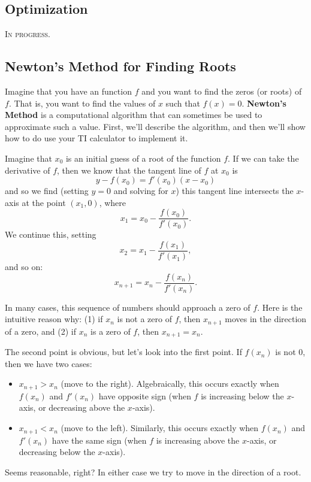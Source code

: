 \documentclass{article}
\newcommand{\mar}[1]{\marginpar{\begin{tcolorbox}[colback=white, arc=0in, left=1mm, right=1mm, leftrule=.3em, bottomrule=.05em, rightrule=.05em, toprule=.05em, halign=flush left]#1\end{tcolorbox}}}
\theoremstyle{definition}
\theoremstyle{definition}
\begin{document}
\subsection{Optimization}
\textsc{In progress.}


\subsection{Newton's Method for Finding Roots}

Imagine that you have an function $f$ and you want to find the zeros (or roots) of $f$. That is, you want to find the values of $x$ such that $f(x)=0$. \textbf{Newton's Method} is a computational algorithm that can sometimes be used to approximate such a value. First, we'll describe the algorithm, and then we'll show how to do use your TI calculator to implement it.

Imagine that $x_0$ is an initial guess of a root of the function $f$. If we can take the derivative of $f$, then we know that the tangent line of $f$ at $x_0$ is
$$y-f(x_0)=f'(x_0)(x-x_0)$$
and so we find (setting $y=0$ and solving for $x$) this tangent line intersects the $x$-axis at the point $(x_1,0)$, where
$$x_1=x_0-\frac{f(x_0)}{f'(x_0)}.$$
We continue this, setting
$$x_2=x_1-\frac{f(x_1)}{f'(x_1)},$$
and so on:
$$x_{n+1}=x_n-\frac{f(x_n)}{f'(x_n)}.$$

In many cases, this sequence of numbers should approach a zero of $f$. Here is the intuitive reason why: (1) if $x_n$ is not a zero of $f$, then $x_{n+1}$ moves in the direction of a zero, and (2) if $x_n$ is a zero of $f$, then $x_{n+1}=x_n$.

The second point is obvious, but let's look into the first point. If $f(x_n)$ is not 0, then we have two cases:
\begin{itemize}
\item $x_{n+1}>x_n$ (move to the right).  Algebraically, this occurs exactly when $f(x_n)$ and $f'(x_n)$ have opposite sign (when $f$ is increasing below the $x$-axis, or decreasing above the $x$-axis).
\item $x_{n+1}<x_n$ (move to the left). Similarly, this occurs exactly when $f(x_n)$ and $f'(x_n)$ have the same sign (when $f$ is increasing above the $x$-axis, or decreasing below the $x$-axis).
\end{itemize}
\mar{Draw a picture showing the four cases.}
Seems reasonable, right? In either case we try to move in the direction of  a root.
\end{document}

